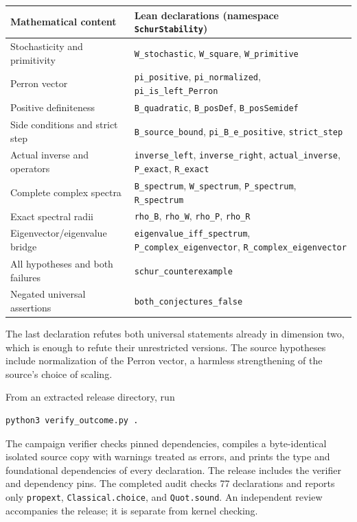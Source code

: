 \documentclass[11pt]{article}
\begin{document}
\begin{center}
\small
\begin{tabular}{@{}>{\raggedright\arraybackslash}p{}>{\raggedright\arraybackslash}p{}@{}}
\toprule
Mathematical content & Lean declarations (namespace \nolinkurl{SchurStability})\\
\midrule
Stochasticity and primitivity & \nolinkurl{W_stochastic}, \nolinkurl{W_square}, \nolinkurl{W_primitive}\\
Perron vector & \nolinkurl{pi_positive}, \nolinkurl{pi_normalized}, \nolinkurl{pi_is_left_Perron}\\
Positive definiteness & \nolinkurl{B_quadratic}, \nolinkurl{B_posDef}, \nolinkurl{B_posSemidef}\\
Side conditions and strict step & \nolinkurl{B_source_bound}, \nolinkurl{pi_B_e_positive}, \nolinkurl{strict_step}\\
Actual inverse and operators & \nolinkurl{inverse_left}, \nolinkurl{inverse_right}, \nolinkurl{actual_inverse}, \nolinkurl{P_exact}, \nolinkurl{R_exact}\\
Complete complex spectra & \nolinkurl{B_spectrum}, \nolinkurl{W_spectrum}, \nolinkurl{P_spectrum}, \nolinkurl{R_spectrum}\\
Exact spectral radii & \nolinkurl{rho_B}, \nolinkurl{rho_W}, \nolinkurl{rho_P}, \nolinkurl{rho_R}\\
Eigenvector/eigenvalue bridge & \nolinkurl{eigenvalue_iff_spectrum}, \nolinkurl{P_complex_eigenvector}, \nolinkurl{R_complex_eigenvector}\\
All hypotheses and both failures & \nolinkurl{schur_counterexample}\\
Negated universal assertions & \nolinkurl{both_conjectures_false}\\
\bottomrule
\end{tabular}
\end{center}

The last declaration refutes both universal statements already in dimension
two, which is enough to refute their unrestricted versions. The source
hypotheses include normalization of the Perron vector, a harmless
strengthening of the source's choice of scaling.

From an extracted release directory, run
\begin{verbatim}
python3 verify_outcome.py .
\end{verbatim}
The campaign verifier checks pinned dependencies, compiles a byte-identical
isolated source copy with warnings treated as errors, and prints the type
and foundational dependencies of every declaration. The release includes the verifier and dependency pins. The completed
audit checks 77 declarations and reports only \nolinkurl{propext},
\nolinkurl{Classical.choice}, and \nolinkurl{Quot.sound}. An independent review accompanies the release; it is separate from kernel checking.
\end{document}
